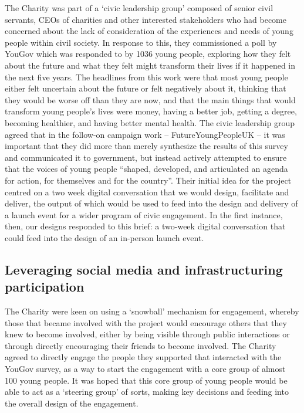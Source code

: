 The Charity was part of a ‘civic leadership group’ composed of senior civil servants, CEOs of charities and other interested stakeholders who had become concerned about the lack of consideration of the experiences and needs of young people within civil society. In response to this, they commissioned a poll by YouGov which was responded to by 1036 young people, exploring how they felt about the future and what they felt might transform their lives if it happened in the next five years. The headlines from this work were that most young people either felt uncertain about the future or felt negatively about it, thinking that they would be worse off than they are now, and that the main things that would transform young people’s lives were money, having a better job, getting a degree, becoming healthier, and having better mental health.  The civic leadership group agreed that in the follow-on campaign work – FutureYoungPeopleUK – it was important that they did more than merely synthesize the results of this survey and communicated it to government, but instead actively attempted to ensure that the voices of young people “shaped, developed, and articulated an agenda for action, for themselves and for the country”. Their initial idea for the project centred on a two week digital conversation that we would design, facilitate and deliver, the output of which would be used to feed into the design and delivery of a launch event for a wider program of civic engagement.  In the first instance, then, our designs responded to this brief: a two-week digital conversation that could feed into the design of an in-person launch event.

\subsection{Leveraging social media and infrastructuring participation}

The Charity were keen on using a ‘snowball’ mechanism for engagement, whereby those that became involved with the project would encourage others that they knew to become involved, either by being visible through public interactions or through directly encouraging their friends to become involved. The Charity agreed to directly engage the people they supported that interacted with the YouGov survey, as a way to start the engagement with a core group of almost 100 young people. It was hoped that this core group of young people would be able to act as a ‘steering group’ of sorts, making key decisions and feeding into the overall design of the engagement.

